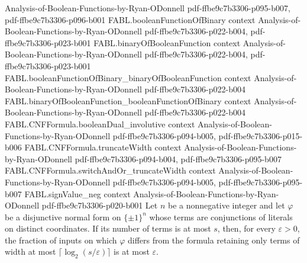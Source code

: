 \begin{theorem}
  {Analysis-of-Boolean-Functions-by-Ryan-ODonnell}
  {pdf-ffbe9c7b3306-p095-b007,
    pdf-ffbe9c7b3306-p096-b001}
\proofstep
  {FABL.booleanFunctionOfBinary}
  {context}
  {Analysis-of-Boolean-Functions-by-Ryan-ODonnell}
  {pdf-ffbe9c7b3306-p022-b004,
    pdf-ffbe9c7b3306-p023-b001}
\proofstep
  {FABL.binaryOfBooleanFunction}
  {context}
  {Analysis-of-Boolean-Functions-by-Ryan-ODonnell}
  {pdf-ffbe9c7b3306-p022-b004,
    pdf-ffbe9c7b3306-p023-b001}
\proofstep
  {FABL.booleanFunctionOfBinary_binaryOfBooleanFunction}
  {context}
  {Analysis-of-Boolean-Functions-by-Ryan-ODonnell}
  {pdf-ffbe9c7b3306-p022-b004}
\proofstep
  {FABL.binaryOfBooleanFunction_booleanFunctionOfBinary}
  {context}
  {Analysis-of-Boolean-Functions-by-Ryan-ODonnell}
  {pdf-ffbe9c7b3306-p022-b004}
\proofstep
  {FABL.CNFFormula.booleanDual_involutive}
  {context}
  {Analysis-of-Boolean-Functions-by-Ryan-ODonnell}
  {pdf-ffbe9c7b3306-p094-b005,
    pdf-ffbe9c7b3306-p015-b006}
\proofstep
  {FABL.CNFFormula.truncateWidth}
  {context}
  {Analysis-of-Boolean-Functions-by-Ryan-ODonnell}
  {pdf-ffbe9c7b3306-p094-b004,
    pdf-ffbe9c7b3306-p095-b007}
\proofstep
  {FABL.CNFFormula.switchAndOr_truncateWidth}
  {context}
  {Analysis-of-Boolean-Functions-by-Ryan-ODonnell}
  {pdf-ffbe9c7b3306-p094-b005,
    pdf-ffbe9c7b3306-p095-b007}
\proofstep
  {FABL.signValue_neg}
  {context}
  {Analysis-of-Boolean-Functions-by-Ryan-ODonnell}
  {pdf-ffbe9c7b3306-p020-b001}
Let $n$ be a nonnegative integer and let $\varphi$ be a disjunctive normal form on
$\{\pm1\}^n$ whose terms are conjunctions of literals on distinct coordinates. If its
number of terms is at most $s$, then, for every $\varepsilon>0$, the fraction of inputs
on which $\varphi$ differs from the formula retaining only terms of width at most
$\lceil\log_2(s/\varepsilon)\rceil$ is at most $\varepsilon$.
\end{theorem}

